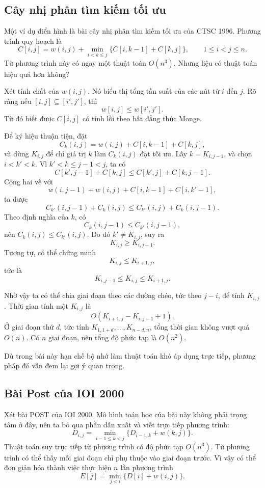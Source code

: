\documentclass[11pt]{article}
\begin{document}
\subsection{Cây nhị phân tìm kiếm tối ưu}

Một ví dụ điển hình là bài cây nhị phân tìm kiếm tối ưu của CTSC 1996. Phương
trình quy hoạch là
\[
  C[i,j]=w(i,j)+\min_{i<k\le j}\{C[i,k-1]+C[k,j]\},
  \qquad 1\le i<j\le n.
\]
Từ phương trình này có ngay một thuật toán \(O(n^3)\). Nhưng liệu có thuật
toán hiệu quả hơn không?

Xét tính chất của \(w(i,j)\). Nó biểu thị tổng tần suất của các nút từ \(i\)
đến \(j\). Rõ ràng nếu \([i,j]\subseteq[i',j']\), thì
\[
  w[i,j]\le w[i',j'].
\]
Từ đó biết được \(C[i,j]\) có tính lồi theo bất đẳng thức Monge.

Để ký hiệu thuận tiện, đặt
\[
  C_k(i,j)=w(i,j)+C[i,k-1]+C[k,j],
\]
và dùng \(K_{i,j}\) để chỉ giá trị \(k\) làm \(C_k(i,j)\) đạt tối ưu. Lấy
\(k=K_{i,j-1}\), và chọn \(i<k'<k\). Vì \(k'<k\le j-1<j\), ta có
\[
  C[k',j-1]+C[k,j]\le C[k',j]+C[k,j-1].
\]
Cộng hai vế với
\[
  w(i,j-1)+w(i,j)+C[i,k-1]+C[i,k'-1],
\]
ta được
\[
  C_{k'}(i,j-1)+C_k(i,j)\le C_{k'}(i,j)+C_k(i,j-1).
\]
Theo định nghĩa của \(k\), có
\[
  C_k(i,j-1)\le C_{k'}(i,j-1),
\]
nên \(C_k(i,j)\le C_{k'}(i,j)\). Do đó \(k'\ne K_{i,j}\), suy ra
\[
  K_{i,j}\ge K_{i,j-1}.
\]
Tương tự, có thể chứng minh
\[
  K_{i,j}\le K_{i+1,j},
\]
tức là
\[
  K_{i,j-1}\le K_{i,j}\le K_{i+1,j}.
\]

Nhờ vậy ta có thể chia giai đoạn theo các đường chéo, tức theo \(j-i\), để
tính \(K_{i,j}\). Thời gian tính một \(K_{i,j}\) là
\[
  O(K_{i+1,j}-K_{i,j-1}+1).
\]
Ở giai đoạn thứ \(d\), tức tính \(K_{1,1+d},\ldots,K_{n-d,n}\), tổng thời gian
không vượt quá \(O(n)\). Có \(n\) giai đoạn, nên tổng độ phức tạp là \(O(n^2)\).

Dù trong bài này hạn chế bộ nhớ làm thuật toán khó áp dụng trực tiếp, phương
pháp đó vẫn đem lại gợi ý quan trọng.

\subsection{Bài Post của IOI 2000}

Xét bài POST của IOI 2000. Mô hình toán học của bài này không phải trọng tâm
ở đây, nên ta bỏ qua phần dẫn xuất và viết trực tiếp phương trình:
\[
  D_{i,j}=\min_{i-1\le k<j}\{D_{i-1,k}+w(k,j)\}.
\]
Thuật toán suy trực tiếp từ phương trình có độ phức tạp \(O(n^3)\). Từ phương
trình có thể thấy mỗi giai đoạn chỉ phụ thuộc vào giai đoạn trước. Vì vậy có
thể đơn giản hóa thành việc thực hiện \(n\) lần phương trình
\[
  E[j]=\min_{j<i}\{D[i]+w(i,j)\}.
\]
\end{document}
